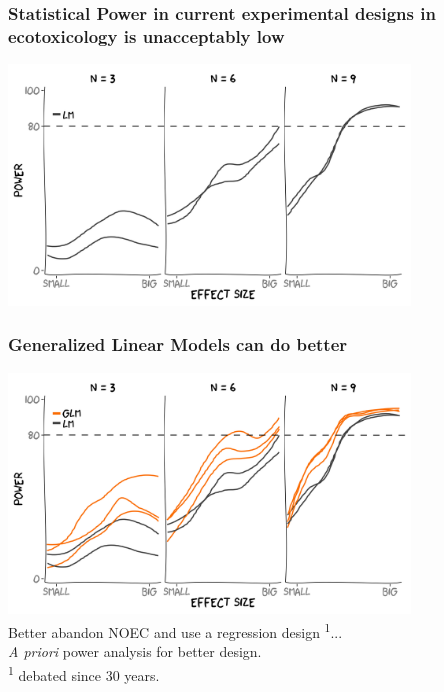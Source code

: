 \documentclass[12pt
, t
]{beamer}
\begin{document}
\begin{frame}
\end{frame}


\begin{frame}
	\frametitle{Statistical Power in current experimental designs in ecotoxicology is unacceptably low}
	\center
	\includegraphics[width = 0.8\textwidth]{fig/glm2.png} \\
\end{frame}


\begin{frame}
\frametitle{Generalized Linear Models can do better}
	\center
	\includegraphics[width = 0.8\textwidth]{fig/glm1.png} \\
	\pause
	\center
	Better abandon NOEC and use a regression design \textsuperscript{1}...\\
	\emph{A priori} power analysis for better design. \\
	\hfill \tiny \textsuperscript{1} debated since 30 years.
\end{frame}
\end{document}
